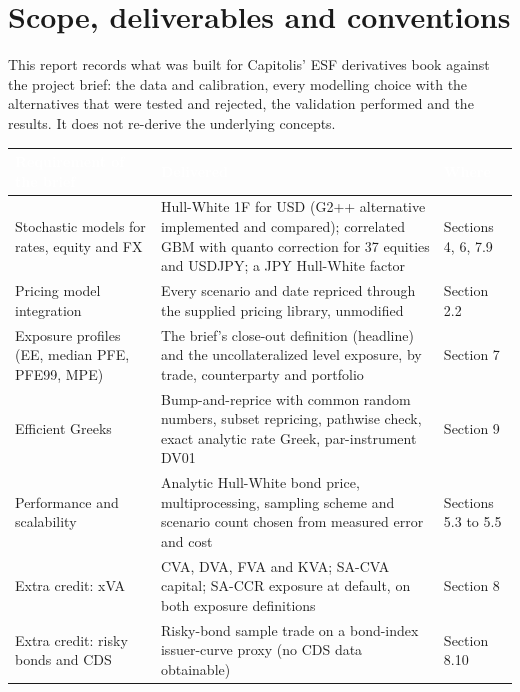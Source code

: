 \documentclass[11pt,letterpaper]{article}
\begin{document}
\section{Scope, deliverables and conventions}
This report records what was built for Capitolis' ESF derivatives book against the project brief: the data and calibration, every modelling choice with the alternatives that were tested and rejected, the validation performed and the results. It does not re-derive the underlying concepts.

{\footnotesize\setlength{\LTpre}{4pt}\setlength{\LTpost}{6pt}
\begin{longtable}{>{\raggedright\arraybackslash}p{}>{\raggedright\arraybackslash}p{}>{\raggedright\arraybackslash}p{}}
\toprule
\rowcolor{navy}\textbf{\textcolor{white}{Requirement of the brief}} & \textbf{\textcolor{white}{Delivered}} & \textbf{\textcolor{white}{Where}} \\
\endhead
Stochastic models for rates, equity and FX & Hull-White 1F for USD (G2++ alternative implemented and compared); correlated GBM with quanto correction for 37 equities and USDJPY; a JPY Hull-White factor & Sections 4, 6, 7.9 \\
\rowcolor{gray!9}Pricing model integration & Every scenario and date repriced through the supplied pricing library, unmodified & Section 2.2 \\
Exposure profiles (EE, median PFE, PFE99, MPE) & The brief's close-out definition (headline) and the uncollateralized level exposure, by trade, counterparty and portfolio & Section 7 \\
\rowcolor{gray!9}Efficient Greeks & Bump-and-reprice with common random numbers, subset repricing, pathwise check, exact analytic rate Greek, par-instrument DV01 & Section 9 \\
Performance and scalability & Analytic Hull-White bond price, multiprocessing, sampling scheme and scenario count chosen from measured error and cost & Sections 5.3 to 5.5 \\
\rowcolor{gray!9}Extra credit: xVA & CVA, DVA, FVA and KVA; SA-CVA capital; SA-CCR exposure at default, on both exposure definitions & Section 8 \\
Extra credit: risky bonds and CDS & Risky-bond sample trade on a bond-index issuer-curve proxy (no CDS data obtainable) & Section 8.10 \\
\bottomrule
\end{longtable}}
\end{document}
